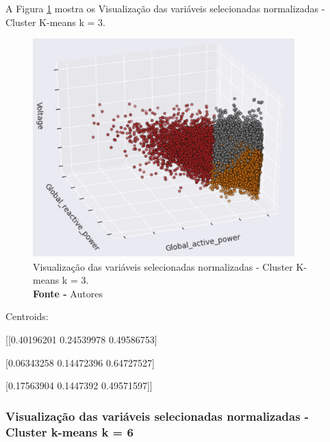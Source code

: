 A Figura \ref{fig: Visualização das variáveis selecionadas normalizadas - Cluster K-means k = 3} mostra os Visualização das variáveis selecionadas normalizadas - Cluster K-means k = 3.
\begin{figure}[H]
    \centering
    \includegraphics[width=0.90\textwidth]{Figuras/4. Resultados e Discussões/Exer4/Visualização das variáveis selecionadas normalizadas - Cluster K-means k = 3.jpg}
    \caption{Visualização das variáveis selecionadas normalizadas - Cluster K-means k = 3.\\ \textbf{Fonte -} Autores}
    \label{fig: Visualização das variáveis selecionadas normalizadas - Cluster K-means k = 3}
\end{figure}

Centroids: 

[[0.40196201 0.24539978 0.49586753]

 [0.06343258 0.14472396 0.64727527]
 
 [0.17563904 0.1447392  0.49571597]]

\subsubsection{Visualização das variáveis selecionadas normalizadas - Cluster k-means k = 6}


